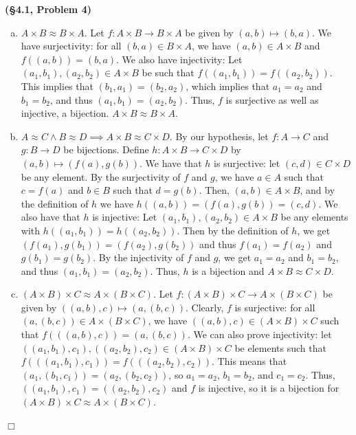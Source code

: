 \documentclass[12pt]{article}
\theoremstyle{definition}
\newenvironment{Solution}{\noindent {\sc Solution.}}{$\Box$ \vspace{2 ex}}
\begin{document}
\vspace{0.5cm}

\begin{Solution}
{\bf (\S4.1, Problem 4)}\\
\begin{enumerate}[(a)]
\item $A \times B \approx B \times A$. Let $f : A \times B \to B \times A$ be given by $(a,b) \mapsto (b,a)$. We have surjectivity: for all $(b,a) \in B \times A$, we have $(a,b) \in A \times B$ and $f((a,b)) = (b,a)$. We also have injectivity: Let $(a_1,b_1),(a_2,b_2)\in A\times B$ be such that $f((a_1,b_1))=f((a_2,b_2))$. This implies that $(b_1,a_1)=(b_2,a_2)$, which implies that $a_1 = a_2$ and $b_1=b_2$, and thus $(a_1,b_1)=(a_2,b_2)$. Thus, $f$ is surjective as well as injective, a bijection. $A \times B \approx B \times A$.
\item $A \approx C \land B \approx D \implies A \times B \approx C \times D$. By our hypothesis, let $f : A \to C$ and $g : B \to D$ be bijections. Define $h : A \times B \to C \times D$ by $(a,b) \mapsto (f(a), g(b))$. We have that $h$ is surjective: let $(c,d)\in C \times D$ be any element. By the surjectivity of $f$ and $g$, we have $a \in A$ such that $c=f(a)$ and $b \in B$ such that $d = g(b)$. Then, $(a,b) \in A \times B$, and by the definition of $h$ we have $h((a,b))=(f(a),g(b))=(c,d)$. We also have that $h$ is injective: Let $(a_1,b_1), (a_2,b_2) \in A \times B$ be any elements with $h((a_1,b_1))=h((a_2,b_2))$. Then by the definition of $h$, we get $(f(a_1),g(b_1))=(f(a_2),g(b_2))$ and thus $f(a_1) = f(a_2)$ and $g(b_1) = g(b_2)$. By the injectivity of $f$ and $g$, we get $a_1 = a_2$ and $b_1 = b_2$, and thus $(a_1,b_1)=(a_2,b_2)$. Thus, $h$ is a bijection and $A \times B \approx C \times D$.
\item $(A \times B) \times C \approx A \times (B\times C)$. Let $f : (A \times B) \times C \to A \times (B \times C)$ be given by $((a,b),c) \mapsto (a,(b,c))$. Clearly, $f$ is surjective: for all $(a,(b,c)) \in A\times (B\times C)$, we have $((a,b),c) \in (A\times B)\times C$ such that $f(((a,b),c)) = (a,(b,c))$. We can also prove injectivity: let $((a_1,b_1),c_1),((a_2,b_2),c_2) \in (A\times B)\times C$ be elements such that $f(((a_1,b_1),c_1)) = f(((a_2,b_2),c_2))$. This means that $(a_1,(b_1,c_1))=(a_2,(b_2,c_2))$, so $a_1=a_2$, $b_1=b_2$, and $c_1=c_2$. Thus, $((a_1,b_1),c_1) =((a_2,b_2),c_2)$ and $f$ is injective, so it is a bijection for $(A \times B)\times C \approx A \times (B\times C)$.

\end{enumerate}
\end{Solution}
\end{document}

